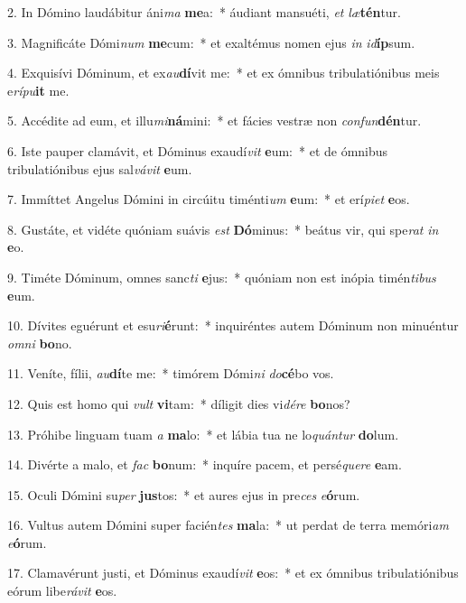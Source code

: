 2. In Dómino laudábitur áni\textit{ma} \textbf{me}a:~*  áudiant mansuéti, \textit{et} \textit{læ}\textbf{tén}tur.\

3. Magnificáte Dómi\textit{num} \textbf{me}cum:~*  et exaltémus nomen ejus \textit{in} \textit{id}\textbf{íp}sum.\

4. Exquisívi Dóminum, et ex\textit{au}\textbf{dí}vit me:~*  et ex ómnibus tribulatiónibus meis e\textit{rí}\textit{pu}\textbf{it} me.\

5. Accédite ad eum, et illu\textit{mi}\textbf{ná}mini:~*  et fácies vestræ non \textit{con}\textit{fun}\textbf{dén}tur.\

6. Iste pauper clamávit, et Dóminus exaudí\textit{vit} \textbf{e}um:~*  et de ómnibus tribulatiónibus ejus sal\textit{vá}\textit{vit} \textbf{e}um.\

7. Immíttet Angelus Dómini in circúitu timénti\textit{um} \textbf{e}um:~*  et erí\textit{pi}\textit{et} \textbf{e}os.\

8. Gustáte, et vidéte quóniam suávis \textit{est} \textbf{Dó}minus:~*  beátus vir, qui spe\textit{rat} \textit{in} \textbf{e}o.\

9. Timéte Dóminum, omnes sanc\textit{ti} \textbf{e}jus:~*  quóniam non est inópia timén\textit{ti}\textit{bus} \textbf{e}um.\

10. Dívites eguérunt et esu\textit{ri}\textbf{é}runt:~*  inquiréntes autem Dóminum non minuéntur \textit{om}\textit{ni} \textbf{bo}no.\

11. Veníte, fílii, \textit{au}\textbf{dí}te me:~*  timórem Dómi\textit{ni} \textit{do}\textbf{cé}bo vos.\

12. Quis est homo qui \textit{vult} \textbf{vi}tam:~*  díligit dies vi\textit{dé}\textit{re} \textbf{bo}nos?\

13. Próhibe linguam tuam \textit{a} \textbf{ma}lo:~*  et lábia tua ne lo\textit{quán}\textit{tur} \textbf{do}lum.\

14. Divérte a malo, et \textit{fac} \textbf{bo}num:~*  inquíre pacem, et persé\textit{que}\textit{re} \textbf{e}am.\

15. Oculi Dómini su\textit{per} \textbf{jus}tos:~*  et aures ejus in pre\textit{ces} \textit{e}\textbf{ó}rum.\

16. Vultus autem Dómini super facién\textit{tes} \textbf{ma}la:~*  ut perdat de terra memóri\textit{am} \textit{e}\textbf{ó}rum.\

17. Clamavérunt justi, et Dóminus exaudí\textit{vit} \textbf{e}os:~*  et ex ómnibus tribulatiónibus eórum libe\textit{rá}\textit{vit} \textbf{e}os.\

